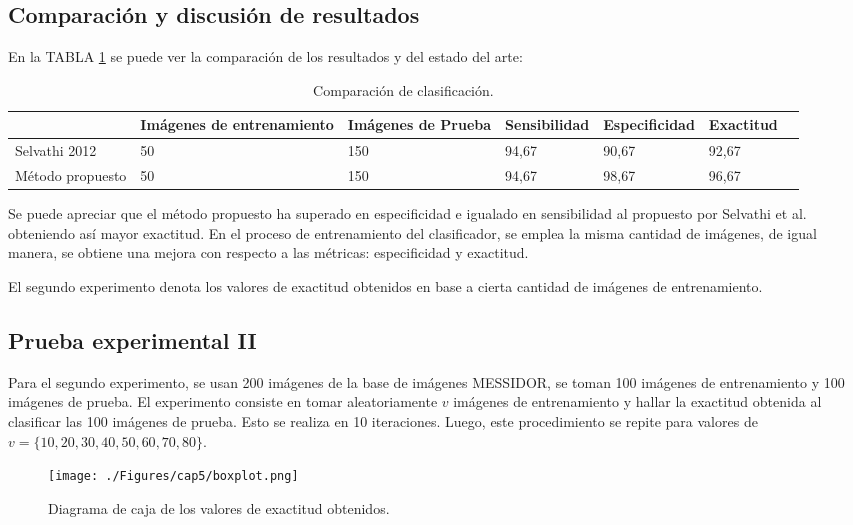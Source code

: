 \subsection{Comparación y discusión de resultados}
 En la TABLA \ref{tab:comparacion} se puede ver la comparación de los resultados y del estado del arte:
 \begin{table}[!hbtp]
 \caption{Comparación de clasificación.}
\begin{center}
\resizebox{15cm}{!} {

\begin{tabular}{|p{3.5cm}|p{2cm}|p{2cm}|p{2cm}|p{2cm}|p{2cm}| p{2cm}}
\hline
 &  Imágenes de entrenamiento &  Imágenes de Prueba & Sensibilidad & Especificidad & Exactitud   \\ 
 
\hline
Selvathi 2012 & 50 & 150& 94,67 & 90,67 & 92,67  \\
Método propuesto& 50 & 150 & 94,67 & 98,67 & 96,67   \\
\hline
\end{tabular}
}

\label{tab:comparacion}
\end{center}
\end{table}


Se puede apreciar que el método propuesto ha superado en especificidad e igualado en sensibilidad al propuesto por Selvathi et al. \cite{selvathi2012automated} obteniendo así mayor exactitud. 
  En el proceso de entrenamiento del clasificador, se emplea la misma cantidad de imágenes, de igual manera, se obtiene una mejora con respecto a las métricas: especificidad y exactitud.


El segundo experimento denota los valores de exactitud obtenidos en base a cierta cantidad de imágenes de entrenamiento.
\subsection{Prueba experimental II}
Para el segundo experimento, se usan 200 imágenes de la base de imágenes MESSIDOR, se toman 100 imágenes de entrenamiento y 100 imágenes de prueba.
El experimento consiste en tomar aleatoriamente $v$ imágenes de entrenamiento y hallar la exactitud obtenida al clasificar las 100 imágenes de prueba. Esto se realiza en 10 iteraciones. Luego, este procedimiento se repite para valores de $v=\{10,20,30,40,50,60,70,80\}$.

 \begin{figure}[H]
	\centering
		\texttt{[image: ./Figures/cap5/boxplot.png]}
	\caption{Diagrama de caja de los valores de exactitud obtenidos.}

	\label{fig:bp}
\end{figure}

